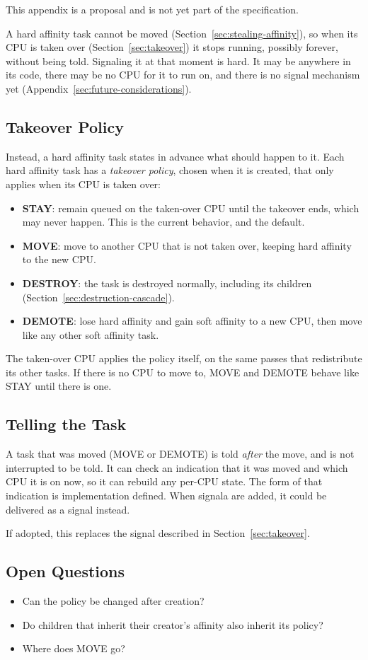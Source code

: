 \documentclass[11pt]{article}
\begin{document}
\begin{pendingbox}
	This appendix is a proposal and is not yet part of the specification.
\end{pendingbox}

A hard affinity task cannot be moved (Section~\ref{sec:stealing-affinity}), so when its CPU is taken over (Section~\ref{sec:takeover}) it stops running, possibly forever, without being told.
Signaling it at that moment is hard. It may be anywhere in its code, there may be no CPU for it to run on, and there is no signal mechanism yet (Appendix~\ref{sec:future-considerations}).

\subsection{Takeover Policy}

Instead, a hard affinity task states in advance what should happen to it.
Each hard affinity task has a \textit{takeover policy}, chosen when it is created, that only applies when its CPU is taken over:

\begin{itemize}
	\item \textbf{STAY}: remain queued on the taken-over CPU until the takeover ends, which may never happen. This is the current behavior, and the default.
	\item \textbf{MOVE}: move to another CPU that is not taken over, keeping hard affinity to the new CPU.
	\item \textbf{DESTROY}: the task is destroyed normally, including its children (Section~\ref{sec:destruction-cascade}).
	\item \textbf{DEMOTE}: lose hard affinity and gain soft affinity to a new CPU, then move like any other soft affinity task.
\end{itemize}

The taken-over CPU applies the policy itself, on the same passes that redistribute its other tasks.
If there is no CPU to move to, MOVE and DEMOTE behave like STAY until there is one.

\subsection{Telling the Task}

A task that was moved (MOVE or DEMOTE) is told \textit{after} the move, and is not interrupted to be told.
It can check an indication that it was moved and which CPU it is on now, so it can rebuild any per-CPU state. The form of that indication is implementation defined.
When signala are added, it could be delivered as a signal instead.

If adopted, this replaces the signal described in Section~\ref{sec:takeover}.

\subsection{Open Questions}

\begin{itemize}
	\item Can the policy be changed after creation?
	\item Do children that inherit their creator's affinity also inherit its policy?
	\item Where does MOVE go?
\end{itemize}
\end{document}
